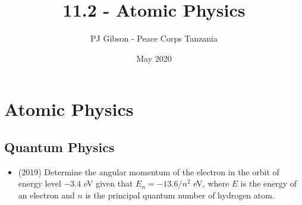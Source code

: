 \documentclass{article}
\title{11.2 - Atomic Physics}
\author{PJ Gibson - Peace Corps Tanzania}
\date{May 2020}
\begin{document}
\maketitle


\section{Atomic Physics}

\subsection{Quantum Physics}
\begin{itemize}
\item (2019)  Determine the angular momentum of the electron in the orbit of energy level $ -3.4$ eV given that $ E_{n}=-13.6/n^{2}$ eV, where $ E$ is the energy of an electron and $ n$ is the principal quantum number of hydrogen atom. 
\end{itemize}
\end{document}
